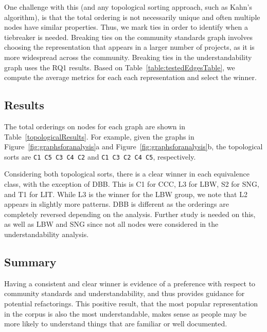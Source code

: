 One challenge with this (and any topological sorting approach, such as Kahn's algorithm), is that the total ordering is not necessarily unique and often multiple nodes have similar properties. 
Thus, we mark ties in order to identify when a tiebreaker is needed.
Breaking ties on the community standards graph involves choosing the representation that appears in a larger number of projects, as it is more widespread across the community. 
Breaking ties in the understandability graph uses the RQ1 results. Based on Table~\ref{table:testedEdgesTable}, we compute the average metrics for each each representation and select the winner. 

\subsection{Results}
The total orderings on nodes for each graph are shown in Table~\ref{topologicalResults}.  For example, given the graphs in Figure~\ref{fig:graphsforanalysis}a and Figure~\ref{fig:graphsforanalysis}b, the topological sorts are {\tt C1 C5 C3 C4 C2} and  {\tt C1 C3 C2 C4 C5}, respectively.



Considering both topological sorts, there is a clear winner in each equivalence class, with the exception of DBB.
This is C1 for CCC, L3 for LBW, S2 for SNG, and T1 for LIT.
While L3 is the winner for the LBW group, we note that L2 appears in slightly more patterns.
DBB is different  as the orderings are completely reversed depending on the analysis. %
Further study is needed on this, as well as  LBW and SNG since not all nodes were considered in the understandability analysis. 
%

\subsection{Summary}
Having a consistent and clear winner is evidence of a preference with respect to community standards and understandability, and thus provides guidance for potential refactorings.
This positive result, that the most popular representation in the corpus is also the most understandable, makes sense as people may be more likely to understand things that are familiar or well documented. 